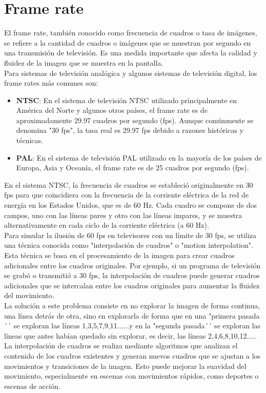 \documentclass[
	12pt, %
	fleqn, %
	a4paper, %
	oneside, %
]{LegrandOrangeBook}
\begin{document}
\section{Frame rate}
El frame rate, también conocido como frecuencia de cuadros o tasa de imágenes, se refiere a la cantidad de cuadros o imágenes que se muestran por segundo en una transmisión de televisión. Es una medida importante que afecta la calidad y fluidez de la imagen que se muestra en la pantalla.\\
Para sistemas de televisión analógica y algunos sistemas de televisión digital, los frame rates más comunes son:
\begin{itemize}
\item \textbf{NTSC}: En el sistema de televisión NTSC utilizado principalmente en América del Norte y algunos otros países, el frame rate es de aproximadamente 29.97 cuadros por segundo (fps). Aunque comúnmente se denomina "30 fps", la tasa real es 29.97 fps debido a razones históricas y técnicas.
\item \textbf{PAL}: En el sistema de televisión PAL utilizado en la mayoría de los países de Europa, Asia y Oceanía, el frame rate es de 25 cuadros por segundo (fps).
\end{itemize}
En el sistema NTSC, la frecuencia de cuadros se estableció originalmente en 30 fps para que coincidiera con la frecuencia de la corriente eléctrica de la red de energía en los Estados Unidos, que es de 60 Hz. Cada cuadro se compone de dos campos, uno con las líneas pares y otro con las líneas impares, y se muestra alternativamente en cada ciclo de la corriente eléctrica (a 60 Hz).\\
Para simular la ilusión de 60 fps en televisores con un límite de 30 fps, se utiliza una técnica conocida como "interpolación de cuadros" o "motion interpolation". Esta técnica se basa en el procesamiento de la imagen para crear cuadros adicionales entre los cuadros originales. Por ejemplo, si un programa de televisión se grabó o transmitió a 30 fps, la interpolación de cuadros puede generar cuadros adicionales que se intercalan entre los cuadros originales para aumentar la fluidez del movimiento.\\
La solución  a este problema consiste  en no explorar la imagen de forma continua, una línea detrás de otra, sino en explorarla de forma que en una "primera pasada´´ se exploran las líneas 1,3,5,7,9,11......y en la "segunda pasada´´ se exploran las   líneas   que   antes   habían   quedado   sin   explorar,   es   decir,   las   líneas 2,4,6,8,10,12.....\\
La interpolación de cuadros se realiza mediante algoritmos que analizan el contenido de los cuadros existentes y generan nuevos cuadros que se ajustan a los movimientos y transiciones de la imagen. Esto puede mejorar la suavidad del movimiento, especialmente en escenas con movimientos rápidos, como deportes o escenas de acción.
\end{document}
